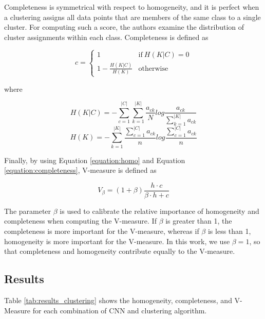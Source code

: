 Completeness is symmetrical with respect to homogeneity, and it is perfect when a clustering assigns all data points that are members of the same class to a single cluster. 
For computing such a score, the authors examine the distribution of cluster assignments within each class.
Completeness is defined as 

\begin{equation}
\label{equation:completeness}
    c = \begin{cases} 1 & \text{if}\ H(K|C) = 0 \\1-\frac{H(K|C)}{H(K)} & \text{otherwise}\end{cases}
\end{equation}

where

\begin{equation}
    H(K|C) =  -\sum_{c=1}^{|C|}{\sum_{k=1}^{|K|}{\frac{a_{ck}}{N}log\frac{a_{ck}}{\sum_{k=1}^{|K|}{a_{ck}}}}}
\end{equation}
\vspace{2em}
\begin{equation}
    H(K) = -\sum_{k=1}^{|K|}{  \frac{\sum_{c=1}^{|C|}a_{ck}}{n}log \frac{\sum_{c=1}^{|C|}a_{ck}}{n} }
\end{equation}
\vspace{1em}

Finally, by using Equation \ref{equation:homo} and Equation \ref{equation:completeness}, V-measure is defined as 

\begin{equation}
    V_{\beta} = (1+\beta)\frac{h\cdot c}{\beta\cdot{h+c}}
\end{equation}
\vspace{0.7em}

The parameter $\beta$ is used to calibrate the relative importance of homogeneity and completeness when computing the V-measure. If $\beta$ is greater than 1, the completeness is more important for the V-measure, whereas 
if $\beta$ is less than 1, homogeneity is more important for the V-measure. 
In this work, we use $\beta = 1$, so that completeness and homogeneity contribute equally to the V-measure.

\subsection{Results}
\label{subsec:results}

Table \ref{tab:results_clustering} shows the homogeneity, completeness, and V-Measure for each combination of CNN and clustering algorithm.

